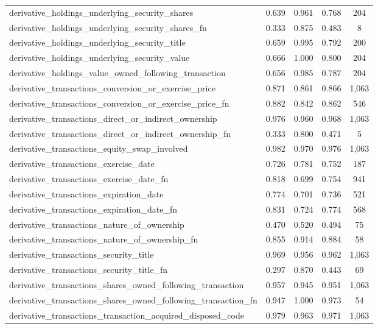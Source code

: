 \documentclass[journal, onecolumn]{IEEEtran}
\begin{document}
\begin{small}
\begin{longtable}{lcccc}
derivative\_holdings\_underlying\_security\_shares & 0.639 & 0.961 & 0.768 & 204 \\
derivative\_holdings\_underlying\_security\_shares\_fn & 0.333 & 0.875 & 0.483 & 8 \\
derivative\_holdings\_underlying\_security\_title & 0.659 & 0.995 & 0.792 & 200 \\
derivative\_holdings\_underlying\_security\_value & 0.666 & 1.000 & 0.800 & 204 \\
derivative\_holdings\_value\_owned\_following\_transaction & 0.656 & 0.985 & 0.787 & 204 \\
derivative\_transactions\_conversion\_or\_exercise\_price & 0.871 & 0.861 & 0.866 & 1,063 \\
derivative\_transactions\_conversion\_or\_exercise\_price\_fn & 0.882 & 0.842 & 0.862 & 546 \\
derivative\_transactions\_direct\_or\_indirect\_ownership & 0.976 & 0.960 & 0.968 & 1,063 \\
derivative\_transactions\_direct\_or\_indirect\_ownership\_fn & 0.333 & 0.800 & 0.471 & 5 \\
derivative\_transactions\_equity\_swap\_involved & 0.982 & 0.970 & 0.976 & 1,063 \\
derivative\_transactions\_exercise\_date & 0.726 & 0.781 & 0.752 & 187 \\
derivative\_transactions\_exercise\_date\_fn & 0.818 & 0.699 & 0.754 & 941 \\
derivative\_transactions\_expiration\_date & 0.774 & 0.701 & 0.736 & 521 \\
derivative\_transactions\_expiration\_date\_fn & 0.831 & 0.724 & 0.774 & 568 \\
derivative\_transactions\_nature\_of\_ownership & 0.470 & 0.520 & 0.494 & 75 \\
derivative\_transactions\_nature\_of\_ownership\_fn & 0.855 & 0.914 & 0.884 & 58 \\
derivative\_transactions\_security\_title & 0.969 & 0.956 & 0.962 & 1,063 \\
derivative\_transactions\_security\_title\_fn & 0.297 & 0.870 & 0.443 & 69 \\
derivative\_transactions\_shares\_owned\_following\_transaction & 0.957 & 0.945 & 0.951 & 1,063 \\
derivative\_transactions\_shares\_owned\_following\_transaction\_fn & 0.947 & 1.000 & 0.973 & 54 \\
derivative\_transactions\_transaction\_acquired\_disposed\_code & 0.979 & 0.963 & 0.971 & 1,063 \\

\end{longtable}
\end{small}
\end{document}
